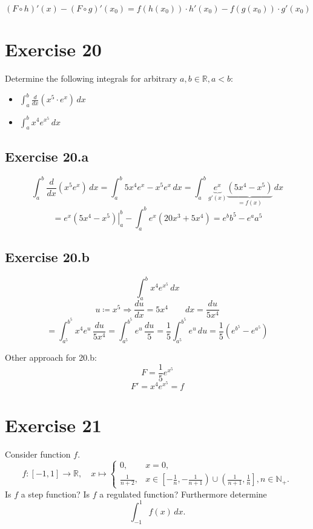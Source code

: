 \documentclass[a4paper]{article}
\theoremstyle{definition}
\begin{document}
\[
  (F \circ h)' (x) - (F \circ g)'(x_0)
  = f(h(x_0)) \cdot h'(x_0) - f(g(x_0)) \cdot g'(x_0)
\]

\section{Exercise 20}
\begin{ex}
  Determine the following integrals for arbitrary $a,b \in \mathbb R, a < b$:
  \begin{itemize}
    \item $\int_a^b \frac{d}{dx} \left(x^5 \cdot e^x\right) \, dx$
    \item $\int_a^b x^4 e^{x^5} \, dx$
  \end{itemize}
\end{ex}

\subsection{Exercise 20.a}
\[
  \int_a^b \frac{d}{dx} \left(x^5 e^{x}\right) \, dx
  = \int_a^b 5x^4 e^x - x^5 e^x \, dx
  = \int_a^b \underbrace{e^x}_{g'(x)} \underbrace{(5 x^4 - x^5)}_{= f(x)} \, dx
\] \[
  = \left.e^x (5x^4 - x^5) \right|_a^b - \int_a^b e^x (20 x^3 + 5x^4)
  = e^b b^5 - e^a a^5
\]

\subsection{Exercise 20.b}
\[
  \int_a^b x^4 e^{x^5} \, dx
\] \[
  u \coloneqq x^5 \Rightarrow \frac{du}{dx} = 5x^4 \qquad dx = \frac{du}{5x^4}
\] \[
  = \int_{a^5}^{b^5} x^4 e^u \, \frac{du}{5x^4}
  = \int_{a^5}^{b^5} e^u \, \frac{du}{5}
  = \frac15 \int_{a^5}^{b^5} e^u \, du
  = \frac15 \left(e^{b^5} - e^{a^5}\right)
\]

Other approach for 20.b:
\[ F = \frac15 e^{x^5} \]
\[ F' = x^4 e^{x^5} = f \]

\section{Exercise 21}
\begin{ex}
  Consider function $f$.
  \[
    f: [-1, 1] \to \mathbb R,
    \quad
    x \mapsto \begin{cases}
      0,              & x = 0, \\
      \frac{1}{n+2},  & x \in \left[-\frac1n, -\frac1{n+1}\right) \cup \left(\frac1{n+1}, \frac1n\right], n \in \mathbb N_+.
    \end{cases}
  \]
  Is $f$ a step function? Is $f$ a regulated function? Furthermore determine
  \[ \int_{-1}^1 f(x) \, dx. \]
\end{ex}
\end{document}
